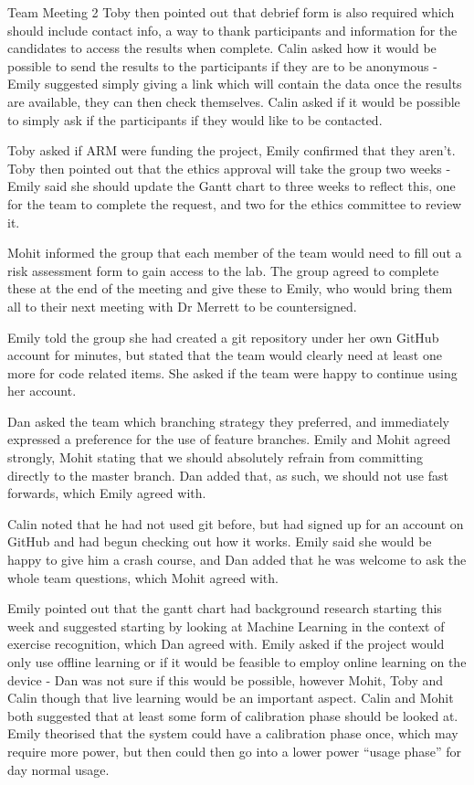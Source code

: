 \documentclass{article}
\begin{document}
\begin{Minutes}{Team Meeting 2}
Toby then pointed out that debrief form is also required which should include contact info, a way to thank
participants and information for the candidates to access the results when complete. Calin asked how it
would be possible to send the results to the participants if they are to be anonymous - Emily suggested
simply giving a link which will contain the data once the results are available, they can then check
themselves. Calin asked if it would be possible to simply ask if the participants if they would like to be
contacted.

Toby asked if ARM were funding the project, Emily confirmed that they aren't. Toby then pointed out that
the ethics approval will take the group two weeks - Emily said she should update the Gantt chart to three
weeks to reflect this, one for the team to complete the request, and two for the ethics committee to review
it.


Mohit informed the group that each member of the team would need to fill out a risk assessment form to gain
access to the lab. The group agreed to complete these at the end of the meeting and give these to Emily, who
would bring them all to their next meeting with Dr Merrett to be countersigned.


Emily told the group she had created a git repository under her own GitHub account for minutes, but stated
that the team would clearly need at least one more for code related items. She asked if the team were happy
to continue using her account.

Dan asked the team which branching strategy they preferred, and immediately expressed a preference for the
use of feature branches. Emily and Mohit agreed strongly, Mohit stating that we should absolutely refrain
from committing directly to the master branch. Dan added that, as such, we should not use fast forwards,
which Emily agreed with.

Calin noted that he had not used git before, but had signed up for an account on GitHub and had begun
checking out how it works. Emily said she would be happy to give him a crash course, and Dan added that
he was welcome to ask the whole team questions, which Mohit agreed with.


Emily pointed out that the gantt chart had background research starting this week and suggested starting
by looking at Machine Learning in the context of exercise recognition, which Dan agreed with. Emily asked
if the project would only use offline learning or if it would be feasible to employ online learning on the
device - Dan was not sure if this would be possible, however Mohit, Toby and Calin though that live learning
would be an important aspect. Calin and Mohit both suggested that at least some form of calibration phase
should be looked at. Emily theorised that the system could have a calibration phase once, which may require
more power, but then could then go into a lower power ``usage phase'' for day normal usage.


\end{Minutes}
\end{document}
